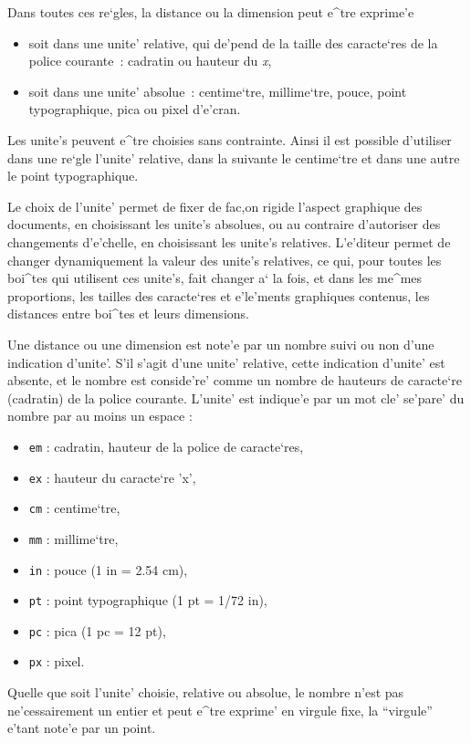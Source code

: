 {Dans toutes ces re`gles, la distance ou la dimension peut e^tre exprime'e
\begin{itemize}
   \item soit dans une unite' relative, qui de'pend de la taille des
         caracte`res de la police courante~: cadratin ou hauteur du {\it x},
   \item soit dans une unite' absolue~: centime`tre, millime`tre, pouce,
         point typographique, pica ou pixel d'e'cran.
\end{itemize}
Les unite's peuvent e^tre choisies sans contrainte. Ainsi il est
possible d'utiliser dans une re`gle l'unite' relative, dans la suivante le
centime`tre et dans une autre le point typographique.

Le choix de l'unite' permet de fixer de fac,on rigide l'aspect graphique
des documents, en choisissant les unite's absolues, ou au contraire d'autoriser
des changements d'e'chelle, en choisissant les unite's relatives. L'e'diteur
permet de changer dynamiquement la valeur des unite's relatives, ce qui, pour
toutes les boi^tes qui utilisent ces unite's, fait changer a` la fois, et dans
les me^mes proportions, les tailles des caracte`res et e'le'ments graphiques
contenus, les distances entre boi^tes et leurs dimensions.

\label{distance}
Une distance ou une dimension est note'e par un nombre suivi ou non d'une
indication d'unite'. S'il s'agit d'une unite' relative, cette indication
d'unite' est absente, et le nombre est conside're' comme un nombre de hauteurs
de caracte`re (cadratin) de la police courante. L'unite' est indique'e par un
mot cle' se'pare' du nombre par au moins un espace :

\begin{itemize}
   \item {\tt em} : cadratin, hauteur de la police de caracte`res,
   \item {\tt ex} : hauteur du caracte`re 'x',
   \item {\tt cm} : centime`tre,
   \item {\tt mm} : millime`tre,
   \item {\tt in} : pouce (1 in = 2.54 cm),
   \item {\tt pt} : point typographique (1 pt = 1/72 in),
   \item {\tt pc} : pica (1 pc = 12 pt),
   \item {\tt px} : pixel.
\end{itemize}

Quelle que soit l'unite' choisie, relative ou absolue, le nombre n'est pas
ne'cessairement un entier et peut e^tre exprime' en virgule fixe, la
``virgule'' e'tant note'e par un point.

}
